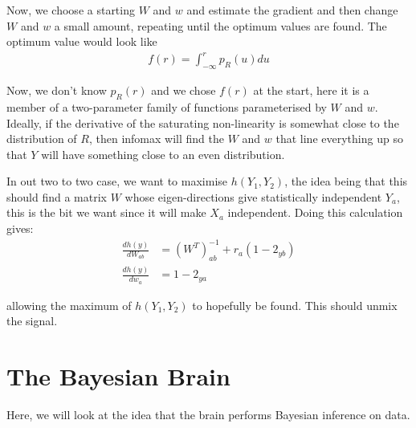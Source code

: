 \documentclass[11pt,a4paper,titlepage,dvipsnames,cmyk]{scrartcl}
\begin{document}
Now, we choose a starting $W$ and $w$ and estimate the gradient and then change $W$ and $w$ a small amount, repeating until the optimum values are found. The optimum value would look like
\begin{align*}
f(r) = \int_{-\infty}^{r} p_R(u) du
\end{align*}

Now, we don't know $p_R(r)$ and we chose $f(r)$ at the start, here it is a member of a two-parameter family of functions parameterised by $W$ and $w$. Ideally, if the derivative of the saturating non-linearity is somewhat close to the distribution of $R$, then infomax will find the $W$ and $w$ that line everything up so that $Y$ will have something close to an even distribution.

In out two to two case, we want to maximise $h(Y_1,Y_2)$, the idea being that this should find a matrix $W$ whose eigen-directions give statistically independent $Y_a$, this is the bit we want since it will make $X_a$ independent. Doing this calculation gives:
\begin{align*}
\frac{dh(y)}{dW_{ab}} &= (W^T)_{ab}^{-1} + r_a (1-2_{yb}) \\
\frac{dh(y)}{dw_a} &= 1-2_{ya}
\end{align*}

allowing the maximum of $h(Y_1,Y_2)$ to hopefully be found. This should unmix the signal.

\section{The Bayesian Brain}
Here, we will look at the idea that the brain performs Bayesian inference on data. 
\end{document}

